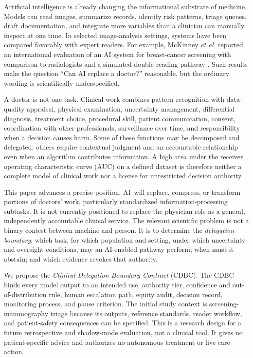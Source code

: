 \documentclass[conference]{IEEEtran}
\newcommand{\CDBC}{\textsc{CDBC}}
\newcommand{\AI}{\textsc{AI}}
\begin{document}
Artificial intelligence is already changing the informational substrate of medicine. Models can read images, summarize records, identify risk patterns, triage queues, draft documentation, and integrate more variables than a clinician can manually inspect at one time. In selected image-analysis settings, systems have been compared favorably with expert readers. For example, McKinney \textit{et al.} reported an international evaluation of an AI system for breast-cancer screening with comparison to radiologists and a simulated double-reading pathway \cite{mckinney2020}. Such results make the question ``Can AI replace a doctor?'' reasonable, but the ordinary wording is scientifically underspecified.

A doctor is not one task. Clinical work combines pattern recognition with data-quality appraisal, physical examination, uncertainty management, differential diagnosis, treatment choice, procedural skill, patient communication, consent, coordination with other professionals, surveillance over time, and responsibility when a decision causes harm. Some of these functions may be decomposed and delegated; others require contextual judgment and an accountable relationship even when an algorithm contributes information. A high area under the receiver operating characteristic curve (AUC) on a defined dataset is therefore neither a complete model of clinical work nor a license for unrestricted decision authority.

This paper advances a precise position. \AI\ will replace, compress, or transform portions of doctors' work, particularly standardized information-processing subtasks. It is not currently positioned to replace the physician role as a general, independently accountable clinical service. The relevant scientific problem is not a binary contest between machine and person. It is to determine the \emph{delegation boundary}: which task, for which population and setting, under which uncertainty and oversight conditions, may an AI-enabled pathway perform; when must it abstain; and which evidence revokes that authority.

We propose the \emph{Clinical Delegation Boundary Contract} (\CDBC). The CDBC binds every model output to an intended use, authority tier, confidence and out-of-distribution rule, human escalation path, equity audit, decision record, monitoring process, and pause criterion. The initial study context is screening-mammography triage because its outputs, reference standards, reader workflow, and patient-safety consequences can be specified. This is a research design for a future retrospective and shadow-mode evaluation, not a clinical tool. It gives no patient-specific advice and authorizes no autonomous treatment or live care action.
\end{document}
